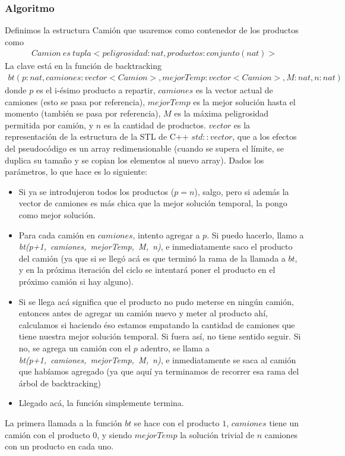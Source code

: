 \subsubsection{Algoritmo}
Definimos la estructura Camión que usaremos como contenedor de los productos como
\begin{align*}
Camion \: es \: tupla<peligrosidad : nat, productos : conjunto(nat)>
\end{align*}
La clave está en la función de backtracking
\begin{align*}
bt(p : nat, camiones : vector<Camion>, mejorTemp : vector<Camion>, M : nat, n : nat)
\end{align*}
donde $p$ es el i-ésimo producto a repartir, $camiones$ es la vector actual de camiones (esto se pasa por referencia), $mejorTemp$ es la mejor solución hasta el momento (también se pasa por referencia), $M$ es la máxima peligrosidad permitida por camión, y $n$ es la cantidad de productos. $vector$ es la representación de la estructura de la STL de C++ $std::vector$, que a los efectos del pseudocódigo es un array redimensionable (cuando se supera el límite, se duplica su tamaño y se copian los elementos al nuevo array).
Dados los parámetros, lo que hace es lo siguiente: 
\begin{itemize}
\item Si ya se introdujeron todos los productos ($p = n$), salgo, pero si además la vector de camiones es más chica que la mejor solución temporal, la pongo como mejor solución.
\item Para cada camión en $camiones$, intento agregar a $p$. Si puedo hacerlo, llamo a \textit{bt(p+1,~camiones,~mejorTemp,~M,~n)}, e inmediatamente saco el producto del camión (ya que si se llegó acá es que terminó la rama de la llamada a $bt$, y en la próxima iteración del ciclo se intentará poner el producto en el próximo camión si hay alguno).
\item Si se llega acá significa que el producto no pudo meterse en ningún camión, entonces antes de agregar un camión nuevo y meter al producto ahí, calculamos si haciendo éso estamos empatando la cantidad de camiones que tiene nuestra mejor solución temporal. Si fuera así, no tiene sentido seguir. Si no, se agrega un camión con el $p$ adentro, se llama a \textit{bt(p+1,~camiones,~mejorTemp,~M,~n)}, e inmediatamente se saca al camión que habíamos agregado (ya que aquí ya terminamos de recorrer esa rama del árbol de backtracking)
\item Llegado acá, la función simplemente termina.
\end{itemize}
La primera llamada a la función $bt$ se hace con el producto $1$, $camiones$ tiene un camión con el producto $0$, y siendo $mejorTemp$ la solución trivial de $n$ camiones con un producto en cada uno.


